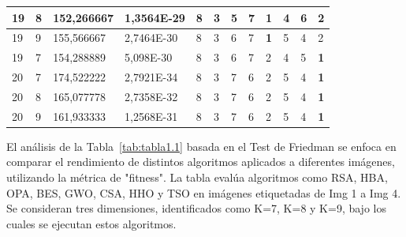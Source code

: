 \documentclass[conference]{IEEEtran}
\begin{document}
\begin{table}[]
\begin{tabular}{|llll|llllllll|}
		\multicolumn{1}{|l|}{19}  & \multicolumn{1}{l|}{8}         & \multicolumn{1}{l|}{152,266667}    & 1,3564E-29 & \multicolumn{1}{l|}{8}   & \multicolumn{1}{l|}{3}   & \multicolumn{1}{l|}{5}   & \multicolumn{1}{l|}{7}   & \multicolumn{1}{l|}{\textbf{1}} & \multicolumn{1}{l|}{4}   & \multicolumn{1}{l|}{6}   & 2                      \\ \hline
		\multicolumn{1}{|l|}{19}  & \multicolumn{1}{l|}{9}         & \multicolumn{1}{l|}{155,566667}    & 2,7464E-30 & \multicolumn{1}{l|}{8}   & \multicolumn{1}{l|}{3}   & \multicolumn{1}{l|}{6}   & \multicolumn{1}{l|}{7}   & \multicolumn{1}{l|}{\textbf{1}} & \multicolumn{1}{l|}{5}   & \multicolumn{1}{l|}{4}   & 2                      \\ \hline
		\multicolumn{1}{|l|}{19}  & \multicolumn{1}{l|}{7}         & \multicolumn{1}{l|}{154,288889}    & 5,098E-30  & \multicolumn{1}{l|}{8}   & \multicolumn{1}{l|}{3}   & \multicolumn{1}{l|}{6}   & \multicolumn{1}{l|}{7}   & \multicolumn{1}{l|}{2}          & \multicolumn{1}{l|}{4}   & \multicolumn{1}{l|}{5}   & \textbf{1}             \\ \hline
		\multicolumn{1}{|l|}{20}  & \multicolumn{1}{l|}{7}         & \multicolumn{1}{l|}{174,522222}    & 2,7921E-34 & \multicolumn{1}{l|}{8}   & \multicolumn{1}{l|}{3}   & \multicolumn{1}{l|}{7}   & \multicolumn{1}{l|}{6}   & \multicolumn{1}{l|}{2}          & \multicolumn{1}{l|}{5}   & \multicolumn{1}{l|}{4}   & \textbf{1}             \\ \hline
		\multicolumn{1}{|l|}{20}  & \multicolumn{1}{l|}{8}         & \multicolumn{1}{l|}{165,077778}    & 2,7358E-32 & \multicolumn{1}{l|}{8}   & \multicolumn{1}{l|}{3}   & \multicolumn{1}{l|}{7}   & \multicolumn{1}{l|}{6}   & \multicolumn{1}{l|}{2}          & \multicolumn{1}{l|}{5}   & \multicolumn{1}{l|}{4}   & \textbf{1}             \\ \hline
		\multicolumn{1}{|l|}{20}  & \multicolumn{1}{l|}{9}         & \multicolumn{1}{l|}{161,933333}    & 1,2568E-31 & \multicolumn{1}{l|}{8}   & \multicolumn{1}{l|}{3}   & \multicolumn{1}{l|}{7}   & \multicolumn{1}{l|}{6}   & \multicolumn{1}{l|}{2}          & \multicolumn{1}{l|}{5}   & \multicolumn{1}{l|}{4}   & \textbf{1}             \\ \hline
	\end{tabular}
	\label{tab:tabla1.2}
\end{table}


\noindent El análisis de la Tabla~\ref{tab:tabla1.1} basada en el Test de Friedman se enfoca en comparar el rendimiento de distintos algoritmos aplicados a diferentes imágenes, utilizando la métrica de "fitness". La tabla evalúa algoritmos como RSA, HBA, OPA, BES, GWO, CSA, HHO y TSO en imágenes etiquetadas de Img 1 a Img 4. Se consideran tres dimensiones, identificados como K=7, K=8 y K=9, bajo los cuales se ejecutan estos algoritmos.
\end{document}
